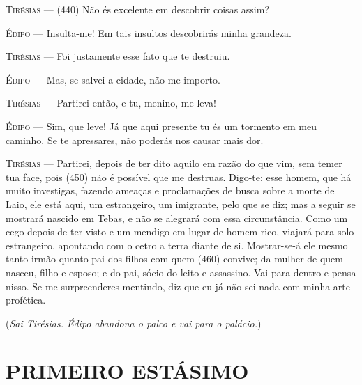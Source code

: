 \textsc{Tirésias} --- (440) Não és excelente em descobrir coisas assim?

\textsc{Édipo} --- Insulta-me! Em tais insultos descobrirás minha grandeza.

\textsc{Tirésias} --- Foi justamente esse fato que te destruiu.

\textsc{Édipo} --- Mas, se salvei a cidade, não me importo.

\textsc{Tirésias} --- Partirei então, e tu, menino, me leva!

\textsc{Édipo} --- Sim, que leve! Já que aqui presente tu és um tormento em meu caminho. Se
te apressares, não poderás nos causar mais dor.

\textsc{Tirésias} --- Partirei, depois de ter dito aquilo em razão do que vim, sem temer tua
face, pois (450) não é possível que me destruas. Digo-te: esse homem,
que há muito investigas, fazendo ameaças e proclamações de busca sobre a
morte de Laio, ele está aqui, um estrangeiro, um imigrante, pelo que se
diz; mas a seguir se mostrará nascido em Tebas, e não se alegrará com
essa circunstância. Como um cego depois de ter visto e um mendigo em
lugar de homem rico, viajará para solo estrangeiro, apontando com o
cetro a terra diante de si. Mostrar-se-á ele mesmo tanto irmão quanto
pai dos filhos com quem (460) convive; da mulher de quem nasceu, filho e
esposo; e do pai, sócio do leito e assassino. Vai para dentro e pensa
nisso. Se me surpreenderes mentindo, diz que eu já não sei nada com
minha arte profética.

(\emph{Sai Tirésias. Édipo abandona o palco e vai para o palácio.})

\section{PRIMEIRO ESTÁSIMO}

